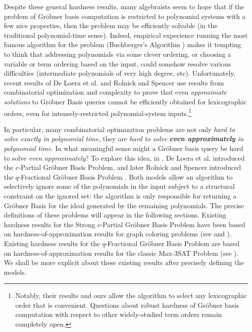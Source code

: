 \documentclass{article}
\begin{document}
Despite these general hardness results, many algebraists seem to hope that if the problem of Gr\"{o}bner basis computation is restricted to polynomial systems with a few nice properties, then the problem may be efficiently solvable (in the traditional polynomial-time sense). Indeed, empirical experience running the most famous algorithm for the problem (Buchberger's Algorithm \cite{buch}) makes it tempting to think that addressing polynomials via some clever ordering, or choosing a variable or term ordering based on the input, could somehow resolve various difficulties (intermediate polynomials of very high degree, etc). Unfortunately, recent results of De Loera et al. \cite{deloera} and Rolnick and Spencer \cite{RS} use results from combinatorial optimization and complexity to prove that even \textit{approximate solutions} to Gr\"{o}bner Basis queries cannot be efficiently obtained for lexicographic orders, even for intensely-restricted polynomial-system inputs.\footnote{Notably, their results and ours allow the algorithm to select any lexicographic order that is convenient. Questions about robust hardness of Gr\"{o}bner basis computation with respect to other widely-studied term orders remain completely open.}

In particular, many combinatorial optimization problems are not only \textit{hard to solve exactly in polynomial time}, they are \textit{hard to solve \textbf{even approximately} in polynomial time}. In what meaningful sense might a Gr\"{o}bner basis query be hard to solve \textit{even approximately}? To explore this idea, in \cite{deloera}, De Loera et al. introduced the $c$-Partial Gr\"{o}bner Basis Problem, and later Rolnick and Spencer introduced the $q$-Fractional Gr\"{o}bner Basis Problem \cite{RS}. Both models allow an algorithm to selectively ignore some of the polynomials in the input subject to a structural constraint on the ignored set: the algorithm is only responsible for returning a Gr\"{o}bner Basis for the ideal generated by  the remaining polynomials. The precise definitions of these problems will appear in the following sections. Existing hardness results for the Strong $c$-Partial Gr\"{o}bner Basis Problem have been based on hardness-of-approximation results for graph coloring problems (see \citep{deloera} and \citep{RS}). Existing hardness results for the $q$-Fractional Gr\"{o}bner Basis Problem are based on hardness-of-approximation results for the classic Max-3SAT Problem (see \citep{RS}). We shall be more explicit about these existing results after precisely defining the models.\\
\end{document}
